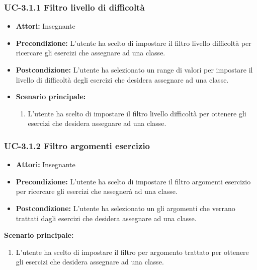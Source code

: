 \subsubsection{UC-3.1.1 Filtro livello di difficoltà}
\begin{itemize}
		\item \textbf{Attori: } Insegnante
		
		\item \textbf{Precondizione: }L'utente ha scelto di impostare il filtro livello difficoltà per ricercare gli esercizi che assegnare ad una classe.
		\item \textbf{Postcondizione: }L'utente ha selezionato un range di valori per impostare il livello di difficoltà degli esercizi che desidera assegnare ad una classe.
		\item \textbf{Scenario principale: }
		\begin{enumerate}
			\item L'utente ha scelto di impostare il filtro livello difficoltà per ottenere gli esercizi che desidera assegnare ad una classe.
		\end{enumerate}
\end{itemize}
\subsubsection{UC-3.1.2 Filtro argomenti esercizio}
\begin{itemize}
		\item \textbf{Attori: } Insegnante
		\item \textbf{Precondizione: }L'utente ha scelto di impostare il filtro argomenti esercizio per ricercare gli esercizi che assegnerà ad una classe.
		\item \textbf{Postcondizione: }L'utente ha selezionato un gli argomenti che verrano trattati dagli esercizi che desidera assegnare ad una classe.
\end{itemize}
		\item \textbf{Scenario principale: }
		\begin{enumerate}
			\item L'utente ha scelto di impostare il filtro per argomento trattato per ottenere gli esercizi che desidera assegnare ad una classe.
		\end{enumerate}
